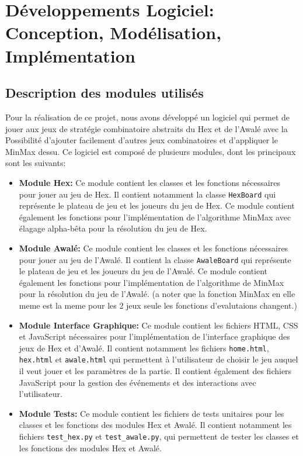 \section{Développements Logiciel: Conception, Modélisation, Implémentation} 
\subsection{Description des modules utilisés}
Pour la réalisation de ce projet, nous avons développé un logiciel qui permet de jouer
aux jeux de stratégie combinatoire abstraits du Hex et de l'Awalé avec la Possibilité
d'ajouter facilement d'autres jeux combinatoires et d'appliquer le MinMax dessu. Ce logiciel est
composé de plusieurs modules, dont les principaux sont les suivants:

\begin{itemize}
    \item \textbf{Module Hex:} Ce module contient les classes et les fonctions nécessaires
    pour jouer au jeu de Hex. Il contient notamment la classe \texttt{HexBoard} qui 
    représente le plateau de jeu et les joueurs du jeu de Hex. Ce module contient également 
    les fonctions pour l'implémentation de l'algorithme MinMax avec élagage alpha-bêta pour 
    la résolution du jeu de Hex.
    
    \item \textbf{Module Awalé:} Ce module contient les classes et les fonctions nécessaires
    pour jouer au jeu de l'Awalé. Il contient la classe \texttt{AwaleBoard} qui représente le
    plateau de jeu et les joueurs du jeu de l'Awalé. Ce module contient également les fonctions
    pour l'implémentation de l'algorithme de MinMax pour la résolution du jeu de l'Awalé. (a noter que la fonction MinMax
    en elle meme est la meme pour les 2 jeux seule les fonctions d'evalutaions changent.)
    
    \item \textbf{Module Interface Graphique:} Ce module contient les fichiers HTML, CSS et
    JavaScript nécessaires pour l'implémentation de l'interface graphique des jeux de Hex et
    d'Awalé. Il contient notamment les fichiers \texttt{home.html}, \texttt{hex.html} et
    \texttt{awale.html} qui permettent à l'utilisateur de choisir le jeu auquel il veut jouer
    et les paramètres de la partie. Il contient également des fichiers JavaScript pour la
    gestion des événements et des interactions avec l'utilisateur.
    
    \item \textbf{Module Tests:} Ce module contient les fichiers de tests unitaires pour les
    classes et les fonctions des modules Hex et Awalé. Il contient notamment les fichiers
    \texttt{test\_hex.py} et \texttt{test\_awale.py}, qui permettent de tester les classes
    et les fonctions des modules Hex et Awalé.
\end{itemize}


